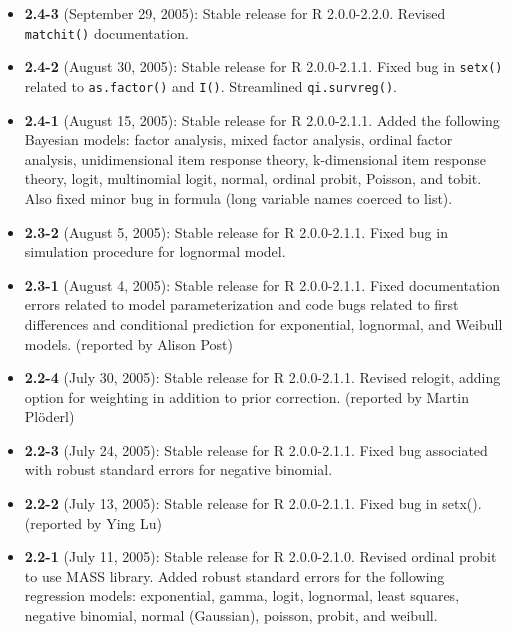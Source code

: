 \begin{itemize}
\item \textbf{2.4-3} (September 29, 2005): Stable release for R
2.0.0-2.2.0.  Revised {\tt matchit()} documentation.  

\item \textbf{2.4-2} (August 30, 2005): Stable release for R 2.0.0-2.1.1.  
  Fixed bug in {\tt setx()} related to {\tt as.factor()} and {\tt I()}.  
Streamlined {\tt qi.survreg()}.  

\item \textbf{2.4-1} (August 15, 2005): Stable release for R 2.0.0-2.1.1.  Added the
  following Bayesian models: factor analysis, mixed factor analysis,
  ordinal factor analysis, unidimensional item response theory,
  k-dimensional item response theory, logit, multinomial logit,
  normal, ordinal probit, Poisson, and tobit.  Also fixed minor bug in
formula (long variable names coerced to list).  

\item \textbf{2.3-2} (August 5, 2005): Stable release for R 2.0.0-2.1.1.  
Fixed bug in simulation procedure for lognormal model. 

\item \textbf{2.3-1} (August 4, 2005): Stable release for R 2.0.0-2.1.1.  
Fixed documentation errors related to model parameterization and code bugs 
related to first differences and conditional prediction for exponential, 
lognormal, and Weibull models.  (reported by Alison Post)

\item \textbf{2.2-4} (July 30, 2005):  Stable release for R
2.0.0-2.1.1.  Revised relogit, adding option for weighting in addition
to prior correction.  (reported by Martin Pl\"oderl)

\item \textbf{2.2-3} (July 24, 2005): Stable release for R 2.0.0-2.1.1.  
Fixed bug associated with robust standard errors for negative binomial.  

\item \textbf{2.2-2} (July 13, 2005): Stable release for R 2.0.0-2.1.1.  
Fixed bug in setx().  (reported by Ying Lu)

\item \textbf{2.2-1} (July 11, 2005):  Stable release for R 2.0.0-2.1.0.  
Revised ordinal probit to use MASS library.  Added robust standard errors 
for the following regression models: exponential, gamma, logit, lognormal, 
least squares, negative binomial, normal (Gaussian), poisson, probit, and 
weibull.


\end{itemize}
